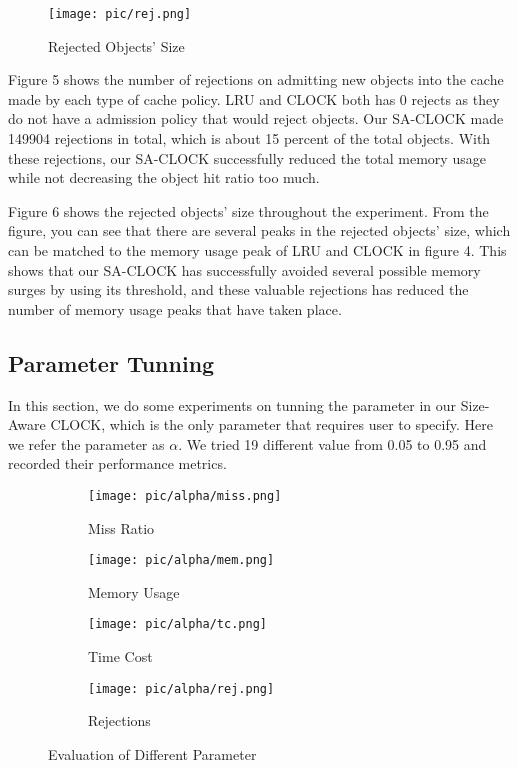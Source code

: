 \documentclass[journal,10.5pt,onecolumn]{IEEEtran}
\begin{document}
\begin{figure}[h]
\centerline{\texttt{[image: pic/rej.png]}}
\caption{Rejected Objects' Size}
\label{fig}
\end{figure}

Figure 5 shows the number of rejections on admitting new objects into the cache made by each type of cache policy. LRU and CLOCK both has 0 rejects as they do not have a admission policy that would reject objects. Our SA-CLOCK made 149904 rejections in total, which is about 15 percent of the total objects. With these rejections, our SA-CLOCK successfully reduced the total memory usage while not decreasing the object hit ratio too much.

Figure 6 shows the rejected objects' size throughout the experiment. From the figure, you can see that there are several peaks in the rejected objects' size, which can be matched to the memory usage peak of LRU and CLOCK in figure 4. This shows that our SA-CLOCK has successfully avoided several possible memory surges by using its threshold, and these valuable rejections has reduced the number of memory usage peaks that have taken place. 


\subsection{Parameter Tunning}
In this section, we do some experiments on tunning the parameter in our Size-Aware CLOCK, which is the only parameter that requires user to specify. Here we refer the parameter as $\alpha$. We tried 19 different value from 0.05 to 0.95 and recorded their performance metrics.

\begin{figure}
  \centering
  \begin{subfigure}[h]{0.4\textwidth}
    \texttt{[image: pic/alpha/miss.png]}
    \caption{Miss Ratio}
    \label{fig:sub1}
  \end{subfigure}
  \hfill
  \begin{subfigure}[h]{0.4\textwidth}
    \texttt{[image: pic/alpha/mem.png]}
    \caption{Memory Usage}
    \label{fig:sub2}
  \end{subfigure}
  
  \medskip
  
  \begin{subfigure}[h]{0.4\textwidth}
    \texttt{[image: pic/alpha/tc.png]}
    \caption{Time Cost}
    \label{fig:sub3}
  \end{subfigure}
  \hfill
  \begin{subfigure}[h]{0.4\textwidth}
    \texttt{[image: pic/alpha/rej.png]}
    \caption{Rejections}
    \label{fig:sub4}
  \end{subfigure}
  
  \caption{Evaluation of Different Parameter}
  \label{fig:main} 
\end{figure}
\end{document}
